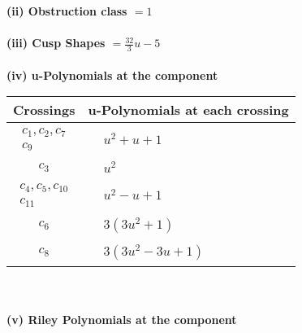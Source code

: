 \documentclass[1p]{elsarticle_modified}
\theoremstyle{definition}
\begin{document}
\flushleft \textbf{(ii) Obstruction class $= 1$}\\~\\
\flushleft \textbf{(iii) Cusp Shapes $= \frac{32}{3} u-5$}\\~\\
\newpage\renewcommand{\arraystretch}{1}
\flushleft \textbf{(iv) u-Polynomials at the component}\newline \\
\begin{tabular}{m{50pt}|m{274pt}}
Crossings & \hspace{64pt}u-Polynomials at each crossing \\
\hline $$\begin{aligned}c_{1},c_{2},c_{7}\\c_{9}\end{aligned}$$&$\begin{aligned}
&u^2+u+1
\end{aligned}$\\
\hline $$\begin{aligned}c_{3}\end{aligned}$$&$\begin{aligned}
&u^2
\end{aligned}$\\
\hline $$\begin{aligned}c_{4},c_{5},c_{10}\\c_{11}\end{aligned}$$&$\begin{aligned}
&u^2- u+1
\end{aligned}$\\
\hline $$\begin{aligned}c_{6}\end{aligned}$$&$\begin{aligned}
&3(3 u^2+1)
\end{aligned}$\\
\hline $$\begin{aligned}c_{8}\end{aligned}$$&$\begin{aligned}
&3(3 u^2-3 u+1)
\end{aligned}$\\
\hline
\end{tabular}\\~\\
\newpage\renewcommand{\arraystretch}{1}
\flushleft \textbf{(v) Riley Polynomials at the component}\newline \\
\end{document}
